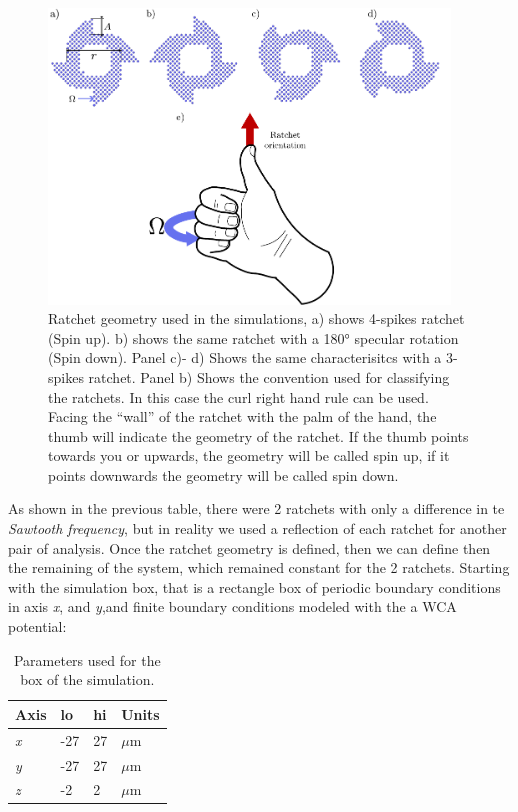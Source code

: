 \begin{figure}
  \begin{center}
    \includegraphics[width=0.95\textwidth]{figures/ratchet.pdf}
  \end{center}
  \caption[Ratchet geomety.]{Ratchet geometry used in the simulations, a) shows 4-spikes ratchet (Spin up). b) shows the same ratchet with a 180° specular rotation (Spin down). Panel c)- d) Shows the same characterisitcs with a 3-spikes ratchet.  Panel b) Shows the convention used for classifying the ratchets. In this case the curl right hand rule can be used. Facing the ``wall'' of the ratchet with the palm of the hand, the thumb will indicate the geometry of the ratchet. If the thumb points towards you or upwards, the geometry will be called spin up, if it points downwards the geometry will be called spin down.}\label{fig:ratchetgeometry}
\end{figure}


As shown in the previous table, there were 2 ratchets with only a difference in te \textit{Sawtooth frequency}, but in reality we used a reflection of each ratchet for another pair of analysis. Once the ratchet geometry is defined, then we can define then the remaining of the system, which remained constant for the 2 ratchets. Starting with the simulation box, that is a rectangle box of periodic boundary conditions in axis \textit{x}, and \textit{y},and finite boundary conditions modeled with the a WCA potential:



\begin{table}[H]
\centering
\caption[Simulation box physical parameters.]{Parameters used for the box of the simulation.}
\begin{tabular}{l l l l}
\hline
Axis & lo  & hi & Units \\
\hline
\textit{x} & -27 & 27 & \( \mu \mathrm{m}\) \\
\textit{y} & -27 & 27 & \( \mu \mathrm{m}\) \\
\textit{z} & -2  & 2   & \( \mu \mathrm{m}\)\\ 
\hline
\end{tabular}
\end{table}

